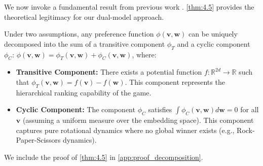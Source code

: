 We now invoke a fundamental result from previous work \cite{balduzzi2019open}. \cref{thm:4.5} provides the theoretical legitimacy for our dual-model approach.
\begin{mdframed}[backgroundcolor=gray!20,linewidth=0pt]
\begin{theorem}
  Under two assumptions, any preference function $\phi(\mathbf{v}, \mathbf{w})$ can be uniquely decomposed into the sum of a transitive component $\phi_T$ and a cyclic component $\phi_C$: $\phi(\mathbf{v}, \mathbf{w}) = \phi_T(\mathbf{v}, \mathbf{w}) + \phi_C(\mathbf{v}, \mathbf{w})$, where:
  \begin{itemize}[noitemsep,nolistsep]
  \item \textbf{Transitive Component:} There exists a potential function $f: \mathbb{R}^{2d} \to \mathbb{R}$ such that $\phi_T(\mathbf{v}, \mathbf{w}) = f(\mathbf{v}) - f(\mathbf{w})$. This component represents the hierarchical ranking capability of the game.
  \item \textbf{Cyclic Component:} The component $\phi_C$ satisfies $\int \phi_C(\mathbf{v}, \mathbf{w}) d\mathbf{w} = 0$ for all $\mathbf{v}$ (assuming a uniform measure over the embedding space). This component captures pure rotational dynamics where no global winner exists (e.g., Rock-Paper-Scissors dynamics).
\end{itemize}
  \label{thm:4.5}
\end{theorem}
\end{mdframed}

We include the proof of \cref{thm:4.5} in \cref{app:proof_decomposition}.
